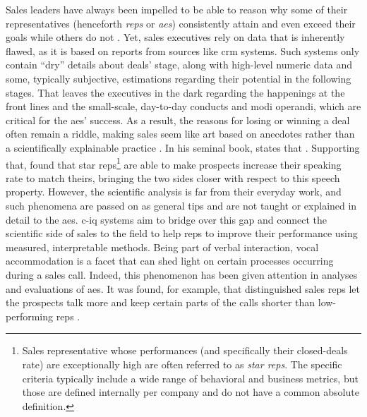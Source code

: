Sales leaders have always been impelled to be able to reason why some of their representatives (henceforth \emph{reps} or \emph{\acp{ae}}) consistently attain and even exceed their goals while others do not \citep{Kovac2017its}.
Yet, sales executives rely on data that is inherently flawed, as it is based on reports from sources like \ac{crm} systems.
Such systems only contain \enquote{dry} details about deals' stage, along with high-level numeric data and some, typically subjective, estimations regarding their potential in the following stages.
That leaves the executives in the dark regarding the happenings at the front lines and the small-scale, day-to-day conducts and modi operandi, which are critical for the \acp{ae}' success.
As a result, the reasons for losing or winning a deal often remain a riddle, making sales seem like art based on anecdotes rather than a scientifically explainable practice \citep{Yohn2016best, Martin2017six}.
In his seminal book, \citet{Gladwell2006tipping} states that .
Supporting that, \citet{Orlob2018nine} found that star reps\footnote{Sales representative whose performances (and specifically their closed-deals rate) are exceptionally high are often referred to as \emph{star reps}.
The specific criteria typically include a wide range of behavioral and business metrics, but those are defined internally per company and do not have a common absolute definition.} are able to make prospects increase their speaking rate to match theirs, bringing the two sides closer with respect to this speech property.
However, the scientific analysis is far from their everyday work, and such phenomena are passed on as general tips and are not taught or explained in detail to the \acp{ae}.
\Ac{c-iq} systems aim to bridge over this gap and connect the scientific side of sales to the field to help reps to improve their performance using measured, interpretable methods.
Being part of verbal interaction, vocal accommodation is a facet that can shed light on certain processes occurring during a sales call.
Indeed, this phenomenon has been given attention in analyses and evaluations of \acp{ae}.
It was found, for example, that distinguished sales reps let the prospects talk more and keep certain parts of the calls shorter than low-performing reps \citep{Orlob2017winning}.

